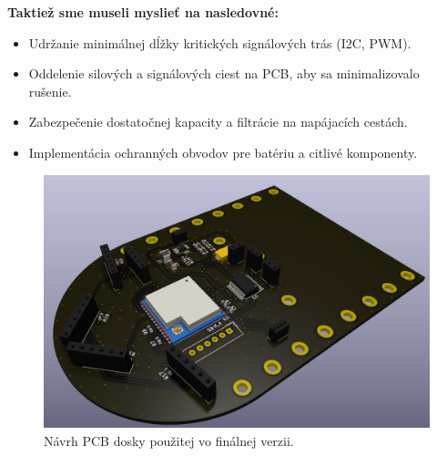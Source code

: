 \textbf{Taktiež sme museli myslieť na nasledovné:}
\begin{itemize}
    \item Udržanie minimálnej dĺžky kritických signálových trás (I2C, PWM).
    \item Oddelenie silových a signálových ciest na PCB, aby sa minimalizovalo rušenie.
    \item Zabezpečenie dostatočnej kapacity a filtrácie na napájacích cestách.
    \item Implementácia ochranných obvodov pre batériu a citlivé komponenty.
\end{itemize}

\begin{figure}[!htpb]
    \centering
    \includegraphics[width=1\linewidth]{includes//images/PCB.png}
    \caption{Návrh PCB dosky použitej vo finálnej verzii.}
    \label{fig:PCB}
\end{figure}

